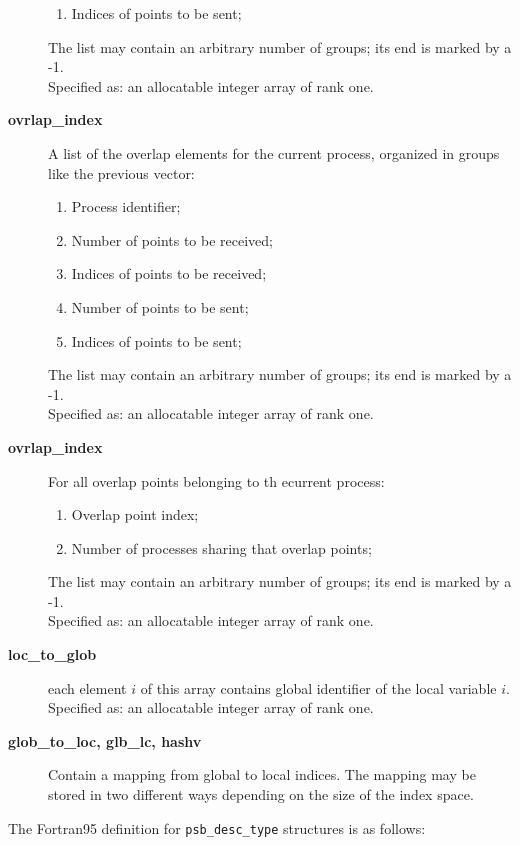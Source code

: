 \begin{description}
\begin{enumerate}
\item Indices of points to be sent;
\end{enumerate}
The list may contain an arbitrary number of groups; its end is marked
by a -1.\\
Specified as: an allocatable integer array of rank one.
\item [{\bf ovrlap\_index}] A list of the overlap elements for the
current process, organized in groups like the previous vector:
\begin{enumerate}
\item Process identifier;
\item Number of points to be received;
\item Indices of points to be received;
\item Number of points to be sent;
\item Indices of points to be sent;
\end{enumerate}
The list may contain an arbitrary number of groups; its end is marked
by a -1.\\
Specified as: an allocatable integer array  of rank one.
\item [{\bf ovrlap\_index}] For all overlap points belonging to th
ecurrent process:
\begin{enumerate}
\item  Overlap point index;
\item  Number of processes sharing that overlap points;
\end{enumerate}
The list may contain an arbitrary number of groups; its end is marked
by a -1.\\
Specified as: an allocatable integer array of rank one.
\item[{\bf loc\_to\_glob}] each element $i$ of this array contains
global identifier of the local variable $i$.\\
Specified as: an allocatable integer array of rank one.
\item[{\bf glob\_to\_loc, glb\_lc, hashv}] Contain a mapping from
  global to local indices. The mapping may be stored in two different
  ways depending on the size of the index space. 
\end{description}
The Fortran95 definition  for \verb|psb_desc_type| structures is 
as follows:
